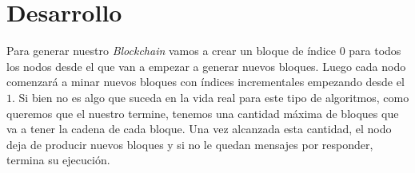 
\section{Desarrollo}








Para generar nuestro \textit{Blockchain} vamos a crear un bloque de \'indice $0$ para todos los nodos desde el que van a empezar a generar nuevos bloques. Luego cada nodo comenzar\'a a minar nuevos bloques con \'indices incrementales empezando desde el $1$. Si bien no es algo que suceda en la vida real para este tipo de algoritmos, como queremos que el nuestro termine, tenemos una cantidad m\'axima de bloques que va a tener la cadena de cada bloque. Una vez alcanzada esta cantidad, el nodo deja de producir nuevos bloques y si no le quedan mensajes por responder, termina su ejecuci\'on.

